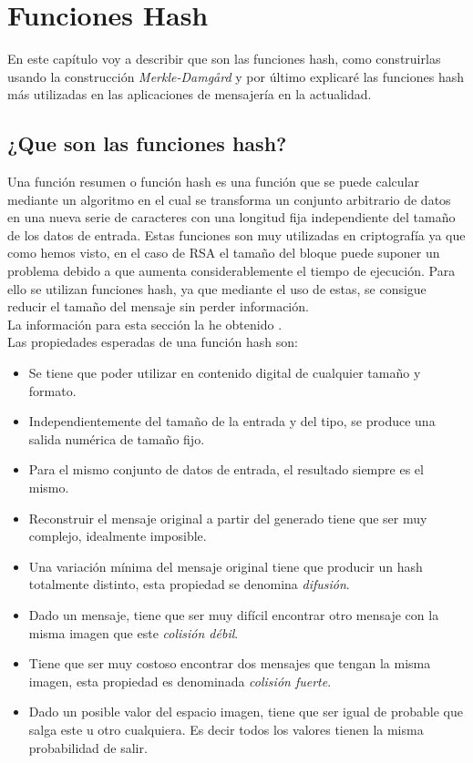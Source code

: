 \chapter{Funciones Hash}
En este capítulo voy a describir que son las funciones hash, como construirlas usando la construcción \emph{Merkle-Damgård} y por último explicaré las funciones hash más utilizadas en las aplicaciones de mensajería en la actualidad.
\section{¿Que son las funciones hash?}
Una función resumen o función hash es una función que se puede calcular mediante un algoritmo en el cual se transforma un conjunto arbitrario de datos en una nueva serie de caracteres con una longitud fija independiente del tamaño de los datos de entrada.
Estas funciones son muy utilizadas en criptografía ya que como hemos visto, en el caso de RSA el tamaño del bloque puede suponer un problema debido a que aumenta considerablemente el tiempo de ejecución.
Para ello se utilizan funciones hash, ya que mediante el uso de estas, se consigue reducir el tamaño del mensaje sin perder información.\\ La información para esta sección la he obtenido \cite{aepd}.\\

Las propiedades esperadas de una función hash son:
\begin{itemize}
	\item Se tiene que poder utilizar en contenido digital de cualquier tamaño y formato.
	\item Independientemente del tamaño de la entrada y del tipo, se produce una salida numérica de tamaño fijo.
	\item Para el mismo conjunto de datos de entrada, el resultado siempre es el mismo.
	\item Reconstruir el mensaje original a partir del generado tiene que ser muy complejo, idealmente imposible.
	\item Una variación mínima del mensaje original tiene que producir un hash totalmente distinto, esta propiedad se denomina \emph{difusión}.
	\item Dado un mensaje, tiene que ser muy difícil encontrar otro mensaje con la misma imagen que este \emph{colisión débil}.
	\item Tiene que ser muy costoso encontrar dos mensajes que tengan la misma imagen, esta propiedad es denominada \emph{colisión fuerte}.
	\item Dado un posible valor del espacio imagen, tiene que ser igual de probable que salga este u otro cualquiera. Es decir todos los valores tienen la misma probabilidad de salir.
\end{itemize}

